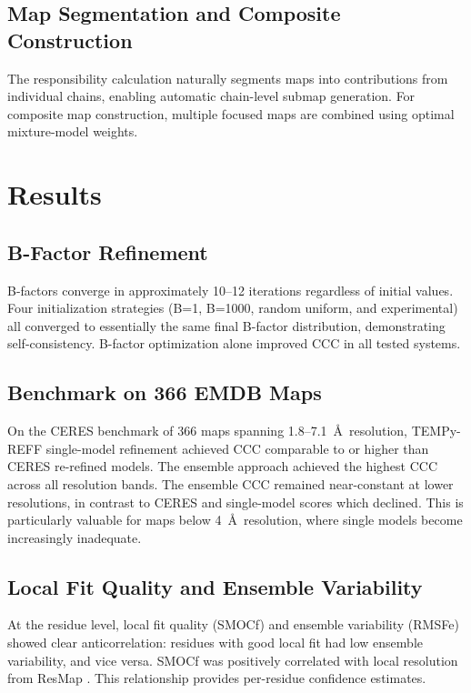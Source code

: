 \documentclass[11pt]{article}
\begin{document}
\subsection{Map Segmentation and Composite Construction}

The responsibility calculation naturally segments maps into contributions from individual chains, enabling automatic chain-level submap generation. For composite map construction, multiple focused maps are combined using optimal mixture-model weights.

\section{Results}

\subsection{B-Factor Refinement}

B-factors converge in approximately 10--12 iterations regardless of initial values. Four initialization strategies (B=1, B=1000, random uniform, and experimental) all converged to essentially the same final B-factor distribution, demonstrating self-consistency. B-factor optimization alone improved CCC in all tested systems.

\subsection{Benchmark on 366 EMDB Maps}

On the CERES benchmark of 366 maps spanning 1.8--7.1~\AA\ resolution, TEMPy-REFF single-model refinement achieved CCC comparable to or higher than CERES re-refined models. The ensemble approach achieved the highest CCC across all resolution bands. The ensemble CCC remained near-constant at lower resolutions, in contrast to CERES and single-model scores which declined. This is particularly valuable for maps below 4~\AA\ resolution, where single models become increasingly inadequate.

\subsection{Local Fit Quality and Ensemble Variability}

At the residue level, local fit quality (SMOCf) and ensemble variability (RMSFe) showed clear anticorrelation: residues with good local fit had low ensemble variability, and vice versa. SMOCf was positively correlated with local resolution from ResMap \citep{kucukelbir2014resmap}. This relationship provides per-residue confidence estimates.
\end{document}
